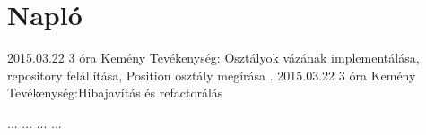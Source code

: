 %
\section{Napló}

\begin{naplo}

\bejegyzes
{2015.03.22}
{3 óra}
{Kemény}
{Tevékenység: Osztályok vázának implementálása, repository felállítása, Position osztály megírása .}
\bejegyzes
{2015.03.22}
{3 óra}
{Kemény}
{Tevékenység:Hibajavítás és refactorálás}

\bejegyzes
{...}
{...}
{...}
{...}


\end{naplo}

